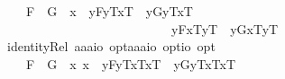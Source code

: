 \begin{isabellebody}
\ \ \ \ {\isachardoublequoteopen}F{}\ \isactrlbold {\isacharequal}\ G{}\ {\isasymequiv}\ \isactrlbold {\isasymforall}x{}{\isachardot}{\isacharparenleft}\ \ {\isacharparenleft}\isactrlbold {\isasymlambda}y{\isachardot}{\isasymlparr}F{}{\isacharcomma}y\isactrlsup T{\isacharcomma}x{}\isactrlsup T{\isasymrparr}{\isacharparenright}\ \isactrlbold {\isacharequal}\ {\isacharparenleft}\isactrlbold {\isasymlambda}y{\isachardot}{\isasymlparr}G{}{\isacharcomma}y\isactrlsup T{\isacharcomma}x{}\isactrlsup T{\isasymrparr}{\isacharparenright}\isanewline
\ \ \ \ \ \ \ \ \ \ \ \ \ \ \ \ \ \ \ \ \ \ \ \ \ \ \isactrlbold {\isasymand}\ {\isacharparenleft}\isactrlbold {\isasymlambda}y{\isachardot}{\isasymlparr}F{}{\isacharcomma}x{}\isactrlsup T{\isacharcomma}y\isactrlsup T{\isasymrparr}{\isacharparenright}\ \isactrlbold {\isacharequal}\ {\isacharparenleft}\isactrlbold {\isasymlambda}y{\isachardot}{\isasymlparr}G{}{\isacharcomma}x{}\isactrlsup T{\isacharcomma}y\isactrlsup T{\isasymrparr}{\isacharparenright}{\isacharparenright}{\isachardoublequoteclose}\isanewline
\isanewline
\ \isamarkupfalse%
\ identityRel{}{\isacharcolon}{\isacharcolon}{\isachardoublequoteopen}\ {\isacharparenleft}{\isacharparenleft}{\isacharprime}a{\isasymRightarrow}{\isacharprime}a{\isasymRightarrow}{\isacharprime}a{\isasymRightarrow}io{\isacharparenright}\ opt{\isacharparenright}{\isasymRightarrow}{\isacharparenleft}{\isacharparenleft}{\isacharprime}a{\isasymRightarrow}{\isacharprime}a{\isasymRightarrow}{\isacharprime}a{\isasymRightarrow}io{\isacharparenright}\ opt{\isacharparenright}{\isasymRightarrow}io\ opt{\isachardoublequoteclose}\ {\isacharparenleft}\ {\isachardoublequoteopen}\isactrlbold {\isacharequal}\ {}{}{\isacharparenright}\ \isanewline
\ \ \ \ {\isachardoublequoteopen}F{}\ \isactrlbold {\isacharequal}\ G{}\ {\isasymequiv}\ \isactrlbold {\isasymforall}x{}\ x{}{\isachardot}{\isacharparenleft}\ \ {\isacharparenleft}\isactrlbold {\isasymlambda}y{\isachardot}{\isasymlparr}F{}{\isacharcomma}y\isactrlsup T{\isacharcomma}x{}\isactrlsup T{\isacharcomma}x{}\isactrlsup T{\isasymrparr}{\isacharparenright}\ \isactrlbold {\isacharequal}\ {\isacharparenleft}\isactrlbold {\isasymlambda}y{\isachardot}{\isasymlparr}G{}{\isacharcomma}y\isactrlsup T{\isacharcomma}x{}\isactrlsup T{\isacharcomma}x{}\isactrlsup T{\isasymrparr}{\isacharparenright}\isanewline

\end{isabellebody}
